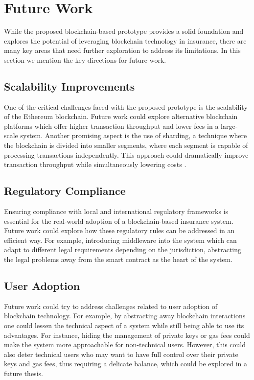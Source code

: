\section{Future Work}\label{section:future_work}
While the proposed blockchain-based prototype provides a solid foundation and explores the potential of leveraging blockchain technology in insurance, there are many key areas that need further exploration to address its limitations. In this section we mention the key directions for future work.

\subsection{Scalability Improvements}
One of the critical challenges faced with the proposed prototype is the scalability of the Ethereum blockchain. Future work could explore alternative blockchain platforms which offer higher transaction throughput and lower fees in a large-scale system. Another promising aspect is the use of sharding, a technique where the blockchain is divided into smaller segments, where each segment is capable of processing transactions independently. This approach could dramatically improve transaction throughput while simultaneously lowering costs \autocite{Hong2022Scaling}.

\subsection{Regulatory Compliance}
Ensuring compliance with local and international regulatory frameworks is essential for the real-world adoption of a blockchain-based insurance system. Future work could explore how these regulatory rules can be addressed in an efficient way. For example, introducing middleware into the system which can adapt to different legal requirements depending on the jurisdiction, abstracting the legal problems away from the smart contract as the heart of the system.

\subsection{User Adoption}
Future work could try to address challenges related to user adoption of blockchain technology. For example, by abstracting away blockchain interactions one could lessen the technical aspect of a system while still being able to use its advantages. For instance, hiding the management of private keys or gas fees could make the system more approachable for non-technical users. However, this could also deter technical users who may want to have full control over their private keys and gas fees, thus requiring a delicate balance, which could be explored in a future thesis.